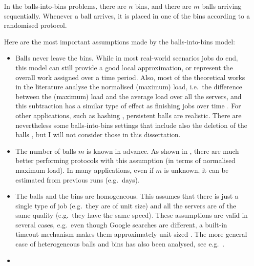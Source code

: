 \begin{definition} \label{definition: balls-into-bins}
In the balls-into-bins problems, there are $n$ bins, and there are $m$ balls arriving sequentially. Whenever a ball arrives, it is placed in one of the bins according to a randomised protocol.
\end{definition}


Here are the most important assumptions made by the balls-into-bins model:


\begin{itemize}
    \item
    Balls never leave the bins. While in most real-world scenarios jobs do end, this model can still provide a good local approximation, or represent the overall work assigned over a time period. Also, most of the theoretical works in the literature analyse the normalised (maximum) load, i.e.\ the difference between the (maximum) load and the average load over all the servers, and this subtraction has a similar type of effect as finishing jobs over time . For other applications, such as hashing \cite{udi2017ballsintobinslandscape}, persistent balls are realistic. There are nevertheless some balls-into-bins settings that include also the deletion of the balls \cite{azar1999twochoice}, but I will not consider those in this dissertation.
    \item
    The number of balls $m$ is known in advance. As shown in \cite{feldheim2021longtermthinning}, there are much better performing protocols with this assumption (in terms of normalised maximum load). In many applications, even if $m$ is unknown, it can be estimated from previous runs (e.g.\ days).
    \item
    The balls and the bins are homogeneous. This assumes that there is just a single type of job (e.g.\ they are of unit size) and all the servers are of the same quality (e.g.\ they have the same speed). These assumptions are valid in several cases, e.g.\ even though Google searches are different, a built-in timeout mechanism makes them approximately unit-sized . The more general case of heterogeneous balls and bins has also been analysed, see e.g.\ \cite{berenbrink2008weighted}.
    \item

\end{itemize}
